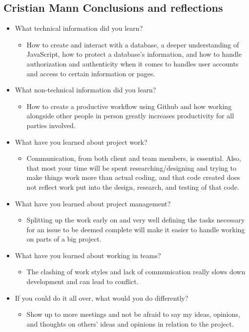 \documentclass[draftclsnofoot,10pt,onecolumn]{IEEEtran}
\begin{document}
\begin{itemize}
\begin{itemize}
    \end{itemize}
\end{itemize}

\subsection{Cristian Mann Conclusions and reflections}
\begin{itemize}
    \item What technical information did you learn?
        \begin{itemize}
            \item How to create and interact with a database, a deeper understanding of JavaScript, how to protect a database's information, and how to handle authorization and authenticity when it comes to handles user accounts and access to certain information or pages.
        \end{itemize}
    \item What non-technical information did you learn?
        \begin{itemize}
            \item How to create a productive workflow using Github and how working alongside other people in person greatly increases productivity for all parties involved.
        \end{itemize}
    \item What have you learned about project work?
        \begin{itemize}
            \item Communication, from both client and team members, is essential. Also, that most your time will be spent researching/designing and trying to make things work more than actual coding, and that code created does not reflect work put into the design, research, and testing of that code.
        \end{itemize}
    \item What have you learned about project management?
        \begin{itemize}
            \item Splitting up the work early on and very well defining the tasks necessary for an issue to be deemed complete will make it easier to handle working on parts of a big project.
        \end{itemize}
    \item What have you learned about working in teams?
        \begin{itemize}
            \item The clashing of work styles and lack of communication really slows down development and can lead to conflict. 
        \end{itemize}
    \item If you could do it all over, what would you do differently?
        \begin{itemize}
            \item Show up to more meetings and not be afraid to say my ideas, opinions, and thoughts on others' ideas and opinions in relation to the project.
        \end{itemize}
\end{itemize}
\end{document}
